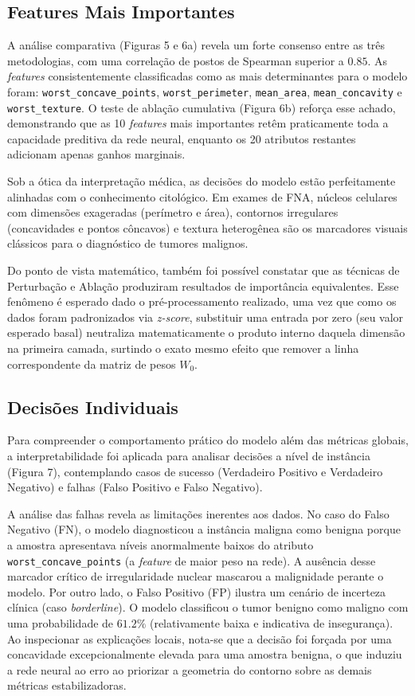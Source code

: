 \documentclass[10pt,a4paper]{article}
\begin{document}
\subsection{Features Mais Importantes}

A análise comparativa (Figuras 5 e 6a) revela um forte consenso entre as três metodologias, com uma correlação de postos de Spearman superior a $0.85$. As \textit{features} consistentemente classificadas como as mais determinantes para o modelo foram: \texttt{worst\_concave\_points}, \texttt{worst\_perimeter}, \texttt{mean\_area}, \texttt{mean\_concavity} e \texttt{worst\_texture}. O teste de ablação cumulativa (Figura 6b) reforça esse achado, demonstrando que as 10 \textit{features} mais importantes retêm praticamente toda a capacidade preditiva da rede neural, enquanto os 20 atributos restantes adicionam apenas ganhos marginais.

Sob a ótica da interpretação médica, as decisões do modelo estão perfeitamente alinhadas com o conhecimento citológico. Em exames de FNA, núcleos celulares com dimensões exageradas (perímetro e área), contornos irregulares (concavidades e pontos côncavos) e textura heterogênea são os marcadores visuais clássicos para o diagnóstico de tumores malignos.

Do ponto de vista matemático, também foi possível constatar que as técnicas de Perturbação e Ablação produziram resultados de importância equivalentes. Esse fenômeno é esperado dado o pré-processamento realizado, uma vez que como os dados foram padronizados via \textit{z-score}, substituir uma entrada por zero (seu valor esperado basal) neutraliza matematicamente o produto interno daquela dimensão na primeira camada, surtindo o exato mesmo efeito que remover a linha correspondente da matriz de pesos $W_0$.

\subsection{Decisões Individuais}

Para compreender o comportamento prático do modelo além das métricas globais, a interpretabilidade foi aplicada para analisar decisões a nível de instância (Figura 7), contemplando casos de sucesso (Verdadeiro Positivo e Verdadeiro Negativo) e falhas (Falso Positivo e Falso Negativo).

A análise das falhas revela as limitações inerentes aos dados. No caso do Falso Negativo (FN), o modelo diagnosticou a instância maligna como benigna porque a amostra apresentava níveis anormalmente baixos do atributo \texttt{worst\_concave\_points} (a \textit{feature} de maior peso na rede). A ausência desse marcador crítico de irregularidade nuclear mascarou a malignidade perante o modelo. Por outro lado, o Falso Positivo (FP) ilustra um cenário de incerteza clínica (caso \textit{borderline}). O modelo classificou o tumor benigno como maligno com uma probabilidade de $61.2\%$ (relativamente baixa e indicativa de insegurança). Ao inspecionar as explicações locais, nota-se que a decisão foi forçada por uma concavidade excepcionalmente elevada para uma amostra benigna, o que induziu a rede neural ao erro ao priorizar a geometria do contorno sobre as demais métricas estabilizadoras.
\end{document}
